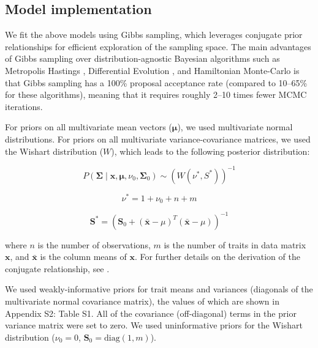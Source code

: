 \documentclass{article}
\begin{document}
\subsection{Model implementation}

We fit the above models using Gibbs sampling, which leverages conjugate prior relationships for efficient exploration of the sampling space.
The main advantages of Gibbs sampling over distribution-agnostic Bayesian algorithms such as Metropolis Hastings \citep{haario_2001_adaptive}, Differential Evolution \citep{terbraak_2008_differential}, and Hamiltonian Monte-Carlo \citep{neal_2011_hmc} is that Gibbs sampling has a 100\% proposal acceptance rate (compared to 10--65\% for these algorithms), meaning that it requires roughly 2--10 times fewer MCMC iterations.

For priors on all multivariate mean vectors ($\bm{\mu}$), we used multivariate normal distributions.
For priors on all multivariate variance-covariance matrices, we used the Wishart distribution ($W$), which leads to the following posterior distribution:

\begin{equation}
P(\bm{\Sigma} \mid
\bm{x}, \bm{\mu},
\nu_0, \bm{\Sigma}_0)
\sim
(W(\nu^*, S^*))^{-1}
\end{equation}

\begin{equation}
\nu^* = 1 + \nu_0 + n + m
\end{equation}

\begin{equation}
\bm{S^*} = (\bm{S}_0 + (\bar{\bm{x}} - \mu)^T (\bar{\bm{x}} - \mu))^{-1}
\end{equation}

where $n$ is the number of observations, $m$ is the number of traits in data matrix $\bm{x}$, and $\bar{\bm{x}}$ is the column means of $\bm{x}$.
For further details on the derivation of the conjugate relationship, see \citet[Section 3.6, "Multivariate normal with unknown mean and variance", pg. 72]{gelman_2003_bayesian}.

We used weakly-informative priors for trait means and variances (diagonals of the multivariate normal covariance matrix), the values of which are shown in Appendix S2: Table S1.
All of the covariance (off-diagonal) terms in the prior variance matrix were set to zero.
We used uninformative priors for the Wishart distribution ($\nu_0 = 0$, $\bm{S}_0 = \mathrm{diag}(1, m)$).
\end{document}
